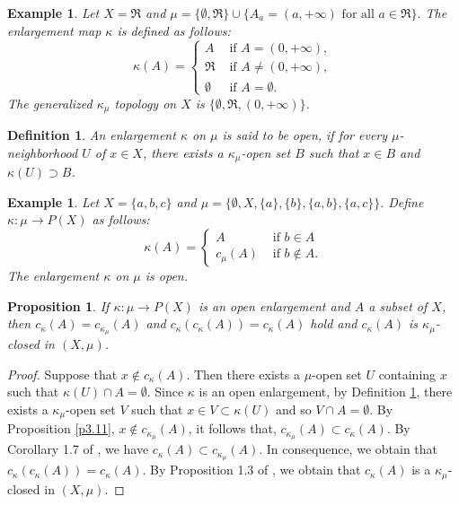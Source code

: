 \documentclass{matua}
\newtheorem{definition}[theorem]{Definition}
\newtheorem{example}[theorem]{Example}
\newtheorem{proposition}[theorem]{Proposition}
\begin{document}
\begin{example}
Let $X=\Re$ and $\mu=\{\emptyset, \Re\}\cup \{A_{a}=(a,+\infty)\mbox{ for all }a\in \Re\}.$
The enlargement map $\kappa$ is defined as follows:
$$\kappa(A) =\left\{
\begin{array}{ccc}
          A & \mbox{ if } A=(0,+\infty),\\
          \Re & \mbox{ if } A\neq (0,+\infty),\\
          \emptyset & \mbox{ if }A=\emptyset.
        \end{array}\right.
        $$
The generalized $\kappa_\mu$ topology on $X$ is
 $\{\emptyset, \Re,(0,+\infty)\}$.
\end{example}
\begin{definition}\label{d3.19}
An enlargement $\kappa$ on $\mu$ is said to be open, if for every $\mu$-neighborhood $U$ of $x\in X$, there exists a $\kappa_\mu$-open set $B$ such that $x\in B$ and $\kappa(U)\supset B$.
\end{definition}
\begin{example}
Let $X=\{a,b,c\}$ and $\mu=\{\emptyset,X,\{a\},\{b\},\{a,b\},\{a,c\}\}.$
Define $\kappa: \mu\rightarrow P(X)$ as follows:
$$\kappa(A) =\left\{
\begin{array}{cc}
          A & \mbox{ if } b\in A\\
          c_\mu(A) & \mbox{ if } b\notin A.
        \end{array}\right.
        $$
The enlargement $\kappa$ on $\mu$ is open.
\end{example}
\begin{proposition}\label{p3.20}
If $\kappa: \mu\rightarrow P(X)$ is an open enlargement and $A$ a subset of $X$, then $c_\kappa
(A)=c_{\kappa_\mu}(A)$ and $c_\kappa(c_\kappa(A))=c_\kappa(A)$ hold and $c_\kappa(A)$ is $\kappa_\mu$-closed in $(X, \mu)$.
\end{proposition}
\begin{proof}
Suppose that $x\notin c_{\kappa}(A)$. Then there exists a $\mu$-open set $U$ containing $x$ such that $\kappa(U)\cap A=\emptyset$. Since $\kappa$ is an open enlargement, by Definition \ref{d3.19}, there exists a $\kappa_\mu$-open set $V$ such that $x\in V\subset \kappa(U)$ and so $V\cap A=\emptyset$. By Proposition \ref{p3.11}, $x\notin c_{\kappa_\mu}(A)$, it follows that, $c_{\kappa_\mu}(A)\subset c_{\kappa}(A)$. By Corollary 1.7 of \cite{cs3}, we have $c_\kappa(A)\subset c_{\kappa_\mu}(A)$. In consequence, we obtain that $c_\kappa(c_\kappa(A))=c_\kappa(A)$. By Proposition 1.3 of \cite{cs3}, we obtain that $c_\kappa(A)$ is a $\kappa_\mu$-closed in $(X, \mu)$.
\end{proof}
\end{document}
